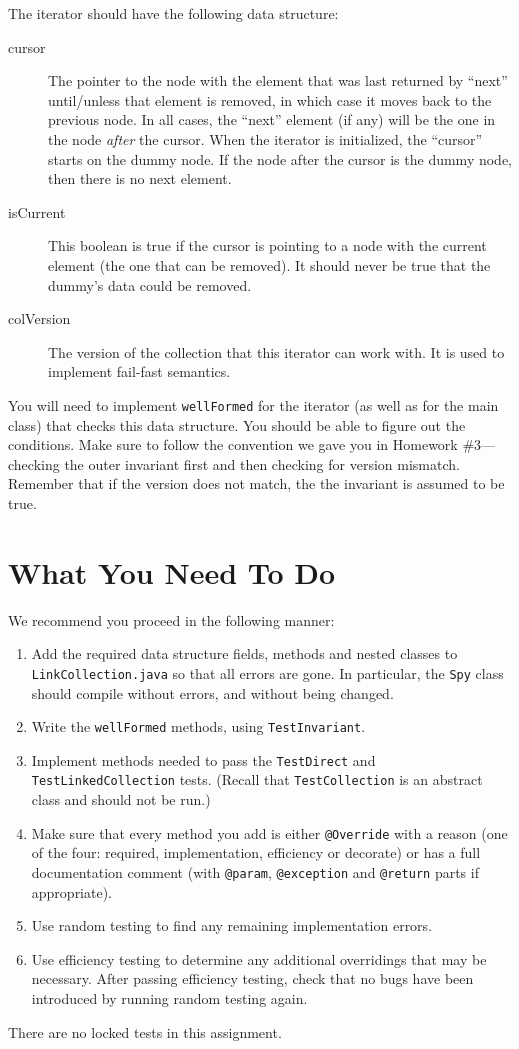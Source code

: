 \documentclass[10pt]{article}
\begin{document}
The iterator should have the following data structure:
\begin{description}
  \item[cursor] The pointer to the node with the element that was last
    returned by ``next'' until/unless that element is removed, in
    which case it moves back to the previous node.  In all cases, the
    ``next'' element (if any) will be the one in the node \emph{after} the
    cursor.  When the iterator is initialized, the ``cursor'' starts
    on the dummy node.  If the node after the cursor is the dummy node,
    then there is no next element.
  \item[isCurrent] This boolean is true if the cursor is pointing to a
    node with the current element (the one that can be removed).  It
    should never be true that the dummy's data could be removed.
  \item[colVersion] The version of the collection that this iterator
    can work with.  It is used to implement fail-fast semantics.
\end{description}
You will need to implement \texttt{wellFormed} for the iterator (as
well as for the main class) that checks this data structure.  You
should be able to figure out the conditions.  Make sure to follow
the convention we gave you in Homework \#3---checking the outer
invariant first and then checking for version mismatch.  Remember that
if the version does not match, the the invariant is assumed to be true.

\section{What You Need To Do}

We recommend you proceed in the following manner:
\begin{enumerate}
  \item Add the required data structure fields, methods and nested
    classes to
    \texttt{LinkCollection.java} so that all errors are gone.
    In particular, the \texttt{Spy} class should compile without
    errors, and without being changed.
  \item Write the \texttt{wellFormed} methods, using
    \texttt{TestInvariant}.
  \item Implement methods needed to pass the \texttt{TestDirect} and
    \texttt{TestLinkedCollection} tests.  (Recall that
    \texttt{TestCollection} is an abstract class and should not be
    run.)
  \item Make sure that every method you add is either
    \verb|@Override| with a reason (one of the four: required,
    implementation, efficiency or decorate) or has a full
    documentation comment (with \verb|@param|,
    \verb|@exception| and \verb|@return| parts if appropriate). 
  \item Use random testing to find any remaining implementation
    errors.
  \item Use efficiency testing to determine any additional overridings
    that may be necessary.  After passing efficiency testing, check
    that no bugs have been introduced by running random testing again.
\end{enumerate}
There are no locked tests in this assignment.
\end{document}
